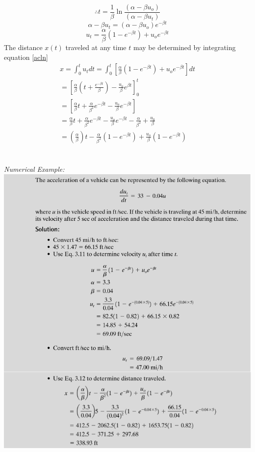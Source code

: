 \begin{equation}
	\therefore t = \frac{1}{\beta}\ln\frac{(\alpha - \beta u_o)}{(\alpha - \beta u_t)}
\end{equation}
\begin{equation*}
	\alpha - \beta u_t = (\alpha - \beta u_o) e^{-\beta t}
\end{equation*}
\begin{equation}
	\label{acln}
	u_t = \frac{\alpha}{\beta} (1 - e^{-\beta t}) + u_o e^{-\beta t}
\end{equation}
The distance $x(t)$ traveled at any time $t$ may be determined by integrating equation \ref{acln}
\begin{gather*}
	x = \int_0^t u_t dt = \int_0^t \left[\frac{\alpha}{\beta} (1 - e^{-\beta t}) + u_o e^{-\beta t} \right] dt\\
	= \left[ \frac{\alpha}{\beta} \left( t + \frac{e^{-\beta t}}{\beta} \right) - \frac{u_o}{\beta} e^{\beta t} \right]_0^t\\
	= \left[ \frac{\alpha}{\beta}  t + \frac{\alpha}{\beta^2} e^{- \beta t} - \frac{u_o}{\beta} e^{- \beta t} \right]\\
	= \frac{\alpha}{\beta} t + \frac{\alpha}{\beta^2} e^{-\beta t} - \frac{u_o}{\beta} e^{-\beta t} - \frac{\alpha}{\beta^2} + \frac{u_0}{\beta}\\
	= \left(\frac{\alpha}{\beta}\right)t - \frac{\alpha}{\beta^2}(1 - e^{-\beta t}) + \frac{u_o}{\beta}(1 - e^{-\beta t})
\end{gather*}\\\\
\newpage
\emph{Numerical Example:}\\
\includegraphics[scale=0.5]{gfx/fig7.png}
